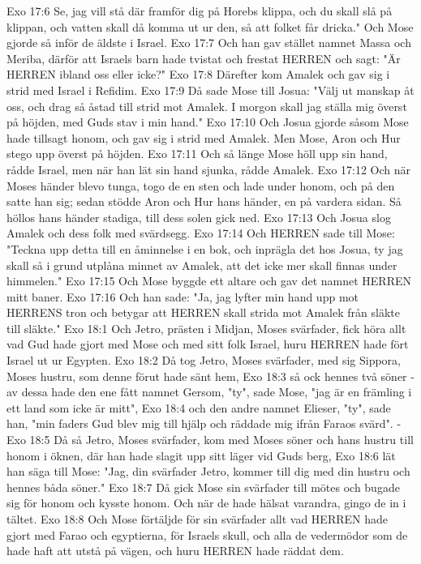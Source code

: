 Exo 17:6  Se, jag vill stå där framför dig på Horebs klippa, och du skall slå på klippan, och vatten skall då komma ut ur den, så att folket får dricka." Och Mose gjorde så inför de äldste i Israel.
Exo 17:7  Och han gav stället namnet Massa och Meriba, därför att Israels barn hade tvistat och frestat HERREN och sagt: "Är HERREN ibland oss eller icke?"
Exo 17:8  Därefter kom Amalek och gav sig i strid med Israel i Refidim.
Exo 17:9  Då sade Mose till Josua: "Välj ut manskap åt oss, och drag så åstad till strid mot Amalek. I morgon skall jag ställa mig överst på höjden, med Guds stav i min hand."
Exo 17:10  Och Josua gjorde såsom Mose hade tillsagt honom, och gav sig i strid med Amalek. Men Mose, Aron och Hur stego upp överst på höjden.
Exo 17:11  Och så länge Mose höll upp sin hand, rådde Israel, men när han lät sin hand sjunka, rådde Amalek.
Exo 17:12  Och när Moses händer blevo tunga, togo de en sten och lade under honom, och på den satte han sig; sedan stödde Aron och Hur hans händer, en på vardera sidan. Så höllos hans händer stadiga, till dess solen gick ned.
Exo 17:13  Och Josua slog Amalek och dess folk med svärdsegg.
Exo 17:14  Och HERREN sade till Mose: "Teckna upp detta till en åminnelse i en bok, och inprägla det hos Josua, ty jag skall så i grund utplåna minnet av Amalek, att det icke mer skall finnas under himmelen."
Exo 17:15  Och Mose byggde ett altare och gav det namnet HERREN mitt baner.
Exo 17:16  Och han sade: "Ja, jag lyfter min hand upp mot HERRENS tron och betygar att HERREN skall strida mot Amalek från släkte till släkte."
Exo 18:1  Och Jetro, prästen i Midjan, Moses svärfader, fick höra allt vad Gud hade gjort med Mose och med sitt folk Israel, huru HERREN hade fört Israel ut ur Egypten.
Exo 18:2  Då tog Jetro, Moses svärfader, med sig Sippora, Moses hustru, som denne förut hade sänt hem,
Exo 18:3  så ock hennes två söner - av dessa hade den ene fått namnet Gersom, "ty", sade Mose, "jag är en främling i ett land som icke är mitt",
Exo 18:4  och den andre namnet Elieser, "ty", sade han, "min faders Gud blev mig till hjälp och räddade mig ifrån Faraos svärd". -
Exo 18:5  Då så Jetro, Moses svärfader, kom med Moses söner och hans hustru till honom i öknen, där han hade slagit upp sitt läger vid Guds berg,
Exo 18:6  lät han säga till Mose: "Jag, din svärfader Jetro, kommer till dig med din hustru och hennes båda söner."
Exo 18:7  Då gick Mose sin svärfader till mötes och bugade sig för honom och kysste honom. Och när de hade hälsat varandra, gingo de in i tältet.
Exo 18:8  Och Mose förtäljde för sin svärfader allt vad HERREN hade gjort med Farao och egyptierna, för Israels skull, och alla de vedermödor som de hade haft att utstå på vägen, och huru HERREN hade räddat dem.
